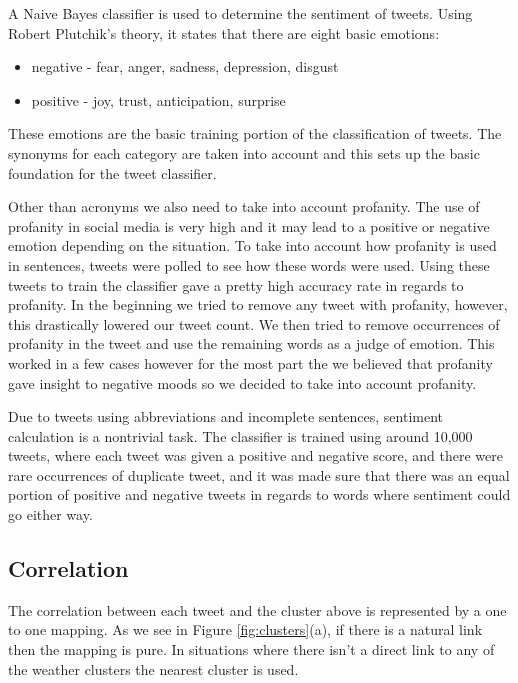 \documentclass[journal]{vgtc}                %
\begin{document}
A Naive Bayes classifier is used to determine the sentiment of tweets.
Using Robert Plutchik's theory, it states that there are eight basic emotions: 
\begin{itemize}
\item negative - fear, anger, sadness, depression, disgust
\item positive - joy, trust, anticipation, surprise
\end{itemize}
    
These emotions are the basic training portion of the classification of tweets. The synonyms for each category are taken into account and this sets up the basic foundation for the tweet classifier. 

Other than acronyms we also need to take into account profanity. The use of profanity in social media is very high and it may lead to a positive or negative emotion depending on the situation. To take into account how profanity is used in sentences, tweets were polled to see how these words were used. Using these tweets to train the classifier gave a pretty high accuracy rate in regards to profanity. In the beginning we tried to remove any tweet with profanity, however, this drastically lowered our tweet count. We then tried to remove occurrences of profanity in the tweet and use the remaining words as a judge of emotion. This worked in a few cases however for the most part the we believed that profanity gave insight to negative moods so we decided to take into account profanity.

Due to tweets using abbreviations and incomplete sentences, sentiment calculation is a nontrivial task. The classifier is trained using around 10,000 tweets, where each tweet was given a positive and negative score, and there were rare occurrences of duplicate tweet, and it was made sure that there was an equal portion of positive and negative tweets in regards to words where sentiment could go either way. 


\subsection{Correlation}
The correlation between each tweet and the cluster above is represented by a one to one mapping. As we see in Figure \ref{fig:clusters}(a), if there is a natural link then the mapping is pure. In situations where there isn't a direct link to any of the weather clusters the nearest cluster is used.
\end{document}

